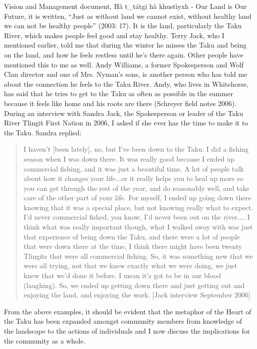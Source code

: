 Vision and Management document, Hà t\_tátgi hà khustìyxh - Our Land is Our Future, it is written, “Just as without land we cannot exist, without healthy land we can not be healthy people” (2003: 17). It is the land, particularly the Taku River, which makes people feel good and stay healthy. Terry Jack, who I mentioned earlier, told me that during the winter he misses the Taku and being on the land, and how he feels restless until he’s there again. Other people have mentioned this to me as well. Andy Williams, a former Spokesperson and Wolf Clan director and one of Mrs. Nyman’s sons, is another person who has told me about the connection he feels to the Taku River. Andy, who lives in Whitehorse, has said that he tries to get to the Taku as often as possible in the summer because it feels like home and his roots are there (Schreyer field notes 2006). During an interview with Sandra Jack, the Spokesperson or leader of the Taku River Tlingit First Nation in 2006, I asked if she ever has the time to make it to the Taku. Sandra replied:

\begin{quote}
I haven’t [been lately], no, but I’ve been down to the Taku. I did a fishing season when I was down there. It was really good because I ended up commercial fishing, and it was just a beautiful time. A lot of people talk about how it changes your life...or it really helps you to heal up more so you can get through the rest of the year, and do reasonably well, and take care of the other part of your life. For myself, I ended up going down there knowing that it was a special place, but not knowing really what to expect. I’d never commercial fished, you know, I’d never been out on the river.... I think what was really important though, what I walked away with was just that experience of being down the Taku, and there were a lot of people that were down there at the time, I think there might have been twenty Tlingits that were all commercial fishing. So, it was something new that we were all trying, not that we knew exactly what we were doing, we just knew that we’d done it before. I mean it’s got to be in our blood (laughing). So, we ended up getting down there and just getting out and enjoying the land, and enjoying the work. [Jack interview September 2006]
\end{quote}

From the above examples, it should be evident that the metaphor of the Heart of the Taku has been expanded amongst community members from knowledge of the landscape to the actions of individuals and I now discuss the implications for the community as a whole.

